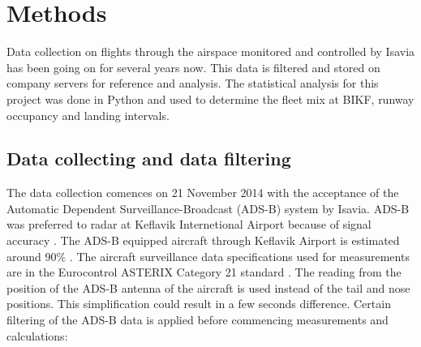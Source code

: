 \chapter{Methods\label{cha:methods}}
Data collection on flights through the airspace monitored and controlled by Isavia has been going on for several years now. This data is filtered and stored on company servers for reference and analysis. The statistical analysis for this project was done in Python and used to determine the fleet mix at BIKF, runway occupancy and landing intervals.

\section{Data collecting and data filtering}
The data collection comences on 21 November 2014 with the acceptance of the Automatic Dependent Surveillance-Broadcast (ADS-B) system by Isavia. ADS-B was preferred to radar at Keflavik Internetional Airport because of signal accuracy \cite{isavia_wiki}. The ADS-B equipped aircraft through Keflavik Airport is estimated around $90\%$ \cite{isavia-rounardeild_rannsoknir_2018}. The aircraft surveillance data specifications used for measurements are in the Eurocontrol ASTERIX Category 21 standard \cite{ASTERIX_ADS-B_specs}.
The reading from the position of the ADS-B antenna of the aircraft is used instead of the tail and nose positions. This simplification could result in a few seconds difference. Certain filtering of the ADS-B data is applied before commencing measurements and calculations: 
